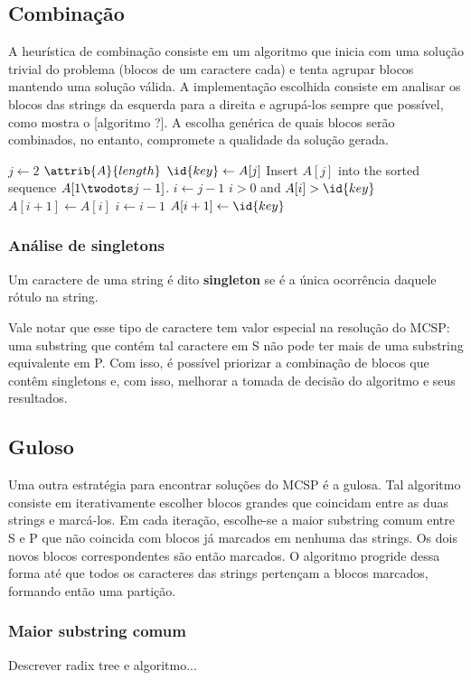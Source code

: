 
\subsection{Combinação}

    A heurística de combinação consiste em um algoritmo que inicia com uma solução trivial do problema (blocos de um caractere cada) e tenta agrupar blocos mantendo uma solução válida. A implementação escolhida consiste em analisar os blocos das strings da esquerda para a direita e agrupá-los sempre que possível, como mostra o [algoritmo ?]. A escolha genérica de quais blocos serão combinados, no entanto, compromete a qualidade da solução gerada.

    \begin{codebox}
    \li \For $j \gets 2$ \To $\attrib{A}{length}$
    \li \Do
    $\id{key} \gets A[j]$
    \li \Comment Insert $A[j]$ into the sorted sequence
    $A[1 \twodots j-1]$.
    \li $i \gets j-1$
    \li \While $i > 0$ and $A[i] > \id{key}$
    \li \Do
    $A[i+1] \gets A[i]$
    \li $i \gets i-1$
    \End
    \li $A[i+1] \gets \id{key}$
    \End
    \end{codebox}

    \subsubsection{Análise de singletons}
    
        \begin{definition}
            Um caractere de uma string é dito \textbf{singleton} se é a única ocorrência daquele rótulo na string.
        \end{definition}

         Vale notar que esse tipo de caractere tem valor especial na resolução do MCSP: uma substring que contém tal caractere em S não pode ter mais de uma substring equivalente em P. Com isso, é possível priorizar a combinação de blocos que contêm singletons e, com isso, melhorar a tomada de decisão do algoritmo e seus resultados.

\subsection{Guloso}

    Uma outra estratégia para encontrar soluções do MCSP é a gulosa. Tal algoritmo consiste em iterativamente escolher blocos grandes que coincidam entre as duas strings e marcá-los. Em cada iteração, escolhe-se a maior substring comum entre S e P que não coincida com blocos já marcados em nenhuma das strings. Os dois novos blocos correspondentes são então marcados. O algoritmo progride dessa forma até que todos os caracteres das strings pertençam a blocos marcados, formando então uma partição.

    \subsubsection{Maior substring comum}

        Descrever radix tree e algoritmo...
